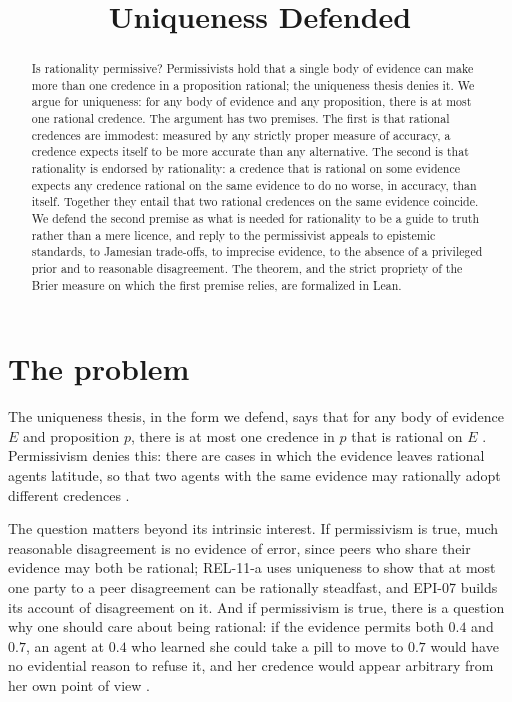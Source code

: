 \documentclass{situationist-preprint}
\title{Uniqueness Defended}
\begin{document}
\maketitle

\begin{abstract}
Is rationality permissive? Permissivists hold that a single body of evidence can make more than one credence in a proposition rational; the uniqueness thesis denies it. We argue for uniqueness: for any body of evidence and any proposition, there is at most one rational credence. The argument has two premises. The first is that rational credences are immodest: measured by any strictly proper measure of accuracy, a credence expects itself to be more accurate than any alternative. The second is that rationality is endorsed by rationality: a credence that is rational on some evidence expects any credence rational on the same evidence to do no worse, in accuracy, than itself. Together they entail that two rational credences on the same evidence coincide. We defend the second premise as what is needed for rationality to be a guide to truth rather than a mere licence, and reply to the permissivist appeals to epistemic standards, to Jamesian trade-offs, to imprecise evidence, to the absence of a privileged prior and to reasonable disagreement. The theorem, and the strict propriety of the Brier measure on which the first premise relies, are formalized in Lean.
\end{abstract}

\section{The problem}

The uniqueness thesis, in the form we defend, says that for any body of evidence $E$ and proposition $p$, there is at most one credence in $p$ that is rational on $E$ \citep{White2005,Feldman2007}. Permissivism denies this: there are cases in which the evidence leaves rational agents latitude, so that two agents with the same evidence may rationally adopt different credences \citep{Rosen2001,Kelly2014,Schoenfield2014}.

The question matters beyond its intrinsic interest. If permissivism is true, much reasonable disagreement is no evidence of error, since peers who share their evidence may both be rational; REL-11-a uses uniqueness to show that at most one party to a peer disagreement can be rationally steadfast, and EPI-07 builds its account of disagreement on it. And if permissivism is true, there is a question why one should care about being rational: if the evidence permits both $0.4$ and $0.7$, an agent at $0.4$ who learned she could take a pill to move to $0.7$ would have no evidential reason to refuse it, and her credence would appear arbitrary from her own point of view \citep{White2005}.
\end{document}
